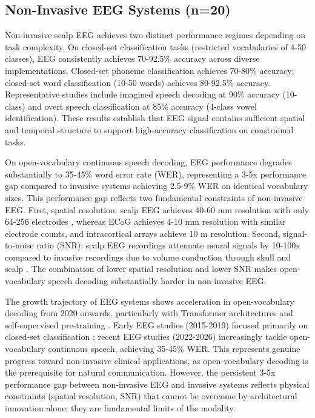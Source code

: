 \subsection{Non-Invasive EEG Systems (n=20)}

Non-invasive scalp EEG achieves two distinct performance regimes depending on task complexity. On closed-set classification tasks (restricted vocabularies of 4-50 classes), EEG consistently achieves 70-92.5\% accuracy \cite{Peterson2021} across diverse implementations. Closed-set phoneme classification achieves 70-80\% accuracy; closed-set word classification (10-50 words) achieves 80-92.5\% accuracy. Representative studies include imagined speech decoding at 90\% accuracy (10-class) and overt speech classification at 85\% accuracy (4-class vowel identification). These results establish that EEG signal contains sufficient spatial and temporal structure to support high-accuracy classification on constrained tasks.

On open-vocabulary continuous speech decoding, EEG performance degrades substantially to 35-45\% word error rate (WER), representing a 3-5x performance gap compared to invasive systems achieving 2.5-9\% WER on identical vocabulary sizes. This performance gap reflects two fundamental constraints of non-invasive EEG. First, spatial resolution: scalp EEG achieves 40-60 mm resolution with only 64-256 electrodes \cite{Schirrmeister2017,Lawhern2018}, whereas ECoG achieves 4-10 mm resolution with similar electrode counts, and intracortical arrays achieve 10 \textmu{}m resolution. Second, signal-to-noise ratio (SNR): scalp EEG recordings attenuate neural signals by 10-100x compared to invasive recordings due to volume conduction through skull and scalp \cite{Schirrmeister2017}. The combination of lower spatial resolution and lower SNR makes open-vocabulary speech decoding substantially harder in non-invasive EEG.

The growth trajectory of EEG systems shows acceleration in open-vocabulary decoding from 2020 onwards, particularly with Transformer architectures and self-supervised pre-training \cite{Wang2022,Duan2023}. Early EEG studies (2015-2019) focused primarily on closed-set classification \cite{Panachakel2021,LopezBernal2022}; recent EEG studies (2022-2026) increasingly tackle open-vocabulary continuous speech, achieving 35-45\% WER. This represents genuine progress toward non-invasive clinical applications, as open-vocabulary decoding is the prerequisite for natural communication. However, the persistent 3-5x performance gap between non-invasive EEG and invasive systems reflects physical constraints (spatial resolution, SNR) that cannot be overcome by architectural innovation alone; they are fundamental limits of the modality.

